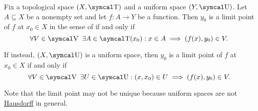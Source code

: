 \begin{Proposition}\label{thm:uniform_space_local_convergence}
  Fix a topological space \( (X, \CT) \) and a uniform space \( (Y, \CU) \). Let \( A \subseteq X \) be a nonempty set and let \( f: A \to Y \) be a function. Then \( y_0 \) is a limit point of \( f \) at \( x_0 \in X \) in the sense of  if and only if
  \begin{equation}\label{thm:uniform_space_local_convergence/topological_source}
    \forall V \in \CV \ \exists A \in \CT(x_0) : x \in A \implies (f(x), y_0) \in V.
  \end{equation}

  If instead, \( (X, \CU) \) is a uniform space, then \( y_0 \) is a limit point of \( f \) at \( x_0 \in X \) if and only if
  \begin{equation}\label{thm:uniform_space_local_convergence/uniform_source}
    \forall V \in \CV \ \exists U \in \CU : (x, x_0) \in U \implies (f(x), y_0) \in V.
  \end{equation}

  Note that the limit point may not be unique because uniform spaces are not \hyperref[def:separation_axioms/T2]{Hausdorff} in general.
\end{Proposition}
